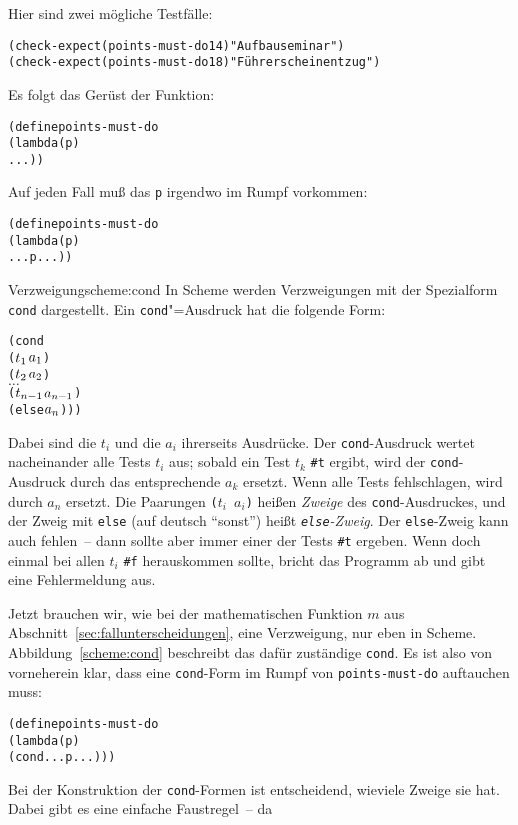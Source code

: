 Hier sind zwei mögliche Testfälle:
%
\begin{alltt}
(check-expect (points-must-do 14) "Aufbauseminar")
(check-expect (points-must-do 18) "Führerscheinentzug")
\end{alltt}   
%
Es folgt das Gerüst der Funktion:
%
\begin{alltt}
(define points-must-do
  (lambda (p)
    ...))
\end{alltt}
%
Auf jeden Fall muß das \texttt{p} irgendwo im Rumpf vorkommen:
%
\begin{alltt}
(define points-must-do
  (lambda (p)
    ... p ...))
\end{alltt}
%
\begin{feature}{Verzweigung}{scheme:cond}
In Scheme werden Verzweigungen
mit der Spezialform \texttt{cond} dargestellt.
Ein \texttt{cond}"=Ausdruck hat die folgende Form:
%
\begin{alltt}
(cond
  (\(t\sb{1}\) \(a\sb{1}\))
  (\(t\sb{2}\) \(a\sb{2}\))
  \(\ldots\)
  (\(t\sb{n-1}\) \(a\sb{n-1}\))
  (else \(a\sb{n}\))))
\end{alltt}
%
Dabei sind die $t_i$ und die $a_i$ ihrerseits Ausdrücke.  Der
\texttt{cond}-Ausdruck wertet nacheinander alle Tests $t_i$ aus;
sobald ein Test $t_k$ \texttt{\#t} ergibt, wird der
\texttt{cond}-Ausdruck durch das entsprechende $a_k$ ersetzt.  Wenn
alle Tests fehlschlagen, wird durch $a_n$ ersetzt.  Die Paarungen
\texttt{($t_i$ $a_i$)} heißen \textit{Zweige} des
\texttt{cond}-Ausdruckes, und der Zweig mit \texttt{else} (auf deutsch
"`sonst"') heißt
\textit{\texttt{else}-Zweig}.
Der \texttt{else}-Zweig kann auch fehlen~-- dann sollte aber immer
einer der Tests \texttt{\#t} ergeben.  Wenn doch einmal bei allen
$t_i$ \verb|#f| herauskommen sollte, bricht \drscheme{} das Programm ab
und gibt eine Fehlermeldung aus.
\end{feature}
%
Jetzt brauchen wir, wie bei der mathematischen Funktion $m$ aus
Abschnitt~\ref{sec:fallunterscheidungen}, eine Verzweigung, nur eben
in Scheme.  Abbildung~\ref{scheme:cond} beschreibt das dafür
zuständige \texttt{cond}.   Es ist also von vorneherein klar, dass eine
\texttt{cond}-Form im Rumpf von \texttt{points-must-do} auftauchen muss:
%
\begin{alltt}
(define points-must-do
  (lambda (p)
    (cond ... p ...)))
\end{alltt}
%
Bei der Konstruktion der \texttt{cond}-Formen ist entscheidend,
wieviele Zweige sie hat.  Dabei gibt es eine einfache Faustregel~-- da
